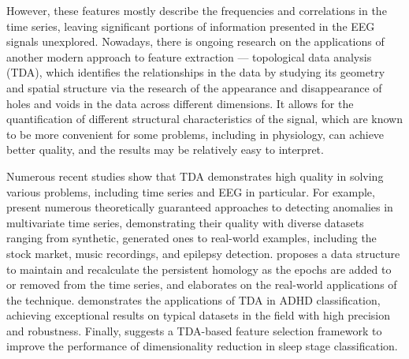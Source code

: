 \documentclass[10pt]{iopart}
\begin{document}
However, these features mostly describe the frequencies and correlations in the time series, leaving significant portions of information presented in the EEG signals unexplored. Nowadays, there is ongoing research on the applications of another modern approach to feature extraction --- topological data analysis (TDA), which identifies the relationships in the data by studying its geometry and spatial structure via the research of the appearance and disappearance of holes and voids in the data across different dimensions. It allows for the quantification of different structural characteristics of the signal, which are known to be more convenient for some problems, including in physiology, can achieve better quality, and the results may be relatively easy to interpret.

Numerous recent studies show that TDA demonstrates high quality in solving various problems, including time series and EEG in particular. For example, \cite{chazal2024topologicalanalysisdetectinganomalies,rai2024identifyingextremeeventsstock,heo2024persistenthomologyfeaturedtime,chrétien2024timetopologicalanalysiseeg} present numerous theoretically guaranteed approaches to detecting anomalies in multivariate time series, demonstrating their quality with diverse datasets ranging from synthetic, generated ones to real-world examples, including the stock market, music recordings, and epilepsy detection. \cite{dimontesano2024dynamicallymaintainingpersistenthomology} proposes a data structure to maintain and recalculate the persistent homology as the epochs are added to or removed from the time series, and \cite{ost2024bananatreespersistencetime} elaborates on the real-world applications of the technique.  \cite{cai2024topologicalfeaturesearchmethod} demonstrates the applications of TDA in ADHD classification, achieving exceptional results on typical datasets in the field with high precision and robustness. Finally, \cite{deng2024twostagehierarchicalexplainablefeature} suggests a TDA-based feature selection framework to improve the performance of dimensionality reduction in sleep stage classification.
\end{document}
